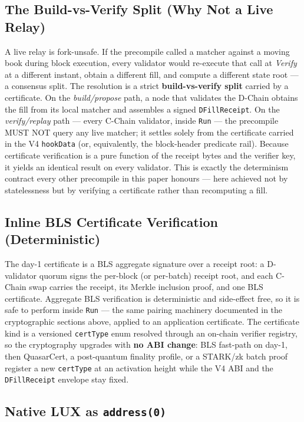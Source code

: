 \subsection{The Build-vs-Verify Split (Why Not a Live Relay)}

A live relay is fork-unsafe. If the precompile called a matcher against a
moving book during block execution, every validator would re-execute that
call at \emph{Verify} at a different instant, obtain a different fill, and
compute a different state root --- a consensus split. The resolution is a
strict \textbf{build-vs-verify split} carried by a certificate. On the
\emph{build/propose} path, a node that validates the D-Chain obtains the
fill from its local matcher and assembles a signed \texttt{DFillReceipt}.
On the \emph{verify/replay} path --- every C-Chain validator, inside
\texttt{Run} --- the precompile MUST NOT query any live matcher; it settles
solely from the certificate carried in the V4 \texttt{hookData} (or,
equivalently, the block-header predicate rail). Because certificate
verification is a pure function of the receipt bytes and the verifier key,
it yields an identical result on every validator. This is exactly the
determinism contract every other precompile in this paper honours --- here
achieved not by statelessness but by verifying a certificate rather than
recomputing a fill.

\subsection{Inline BLS Certificate Verification (Deterministic)}

The day-1 certificate is a BLS aggregate signature over a receipt root: a
D-validator quorum signs the per-block (or per-batch) receipt root, and
each C-Chain swap carries the receipt, its Merkle inclusion proof, and one
BLS certificate. Aggregate BLS verification is deterministic and side-effect
free, so it is safe to perform inside \texttt{Run} --- the same pairing
machinery documented in the cryptographic sections above, applied to an
application certificate. The certificate kind is a versioned
\texttt{certType} enum resolved through an on-chain verifier registry, so
the cryptography upgrades with \textbf{no ABI change}: BLS fast-path on
day-1, then QuasarCert, a post-quantum finality profile, or a STARK/zk
batch proof register a new \texttt{certType} at an activation height while
the V4 ABI and the \texttt{DFillReceipt} envelope stay fixed.

\subsection{Native LUX as \texttt{address(0)}}

